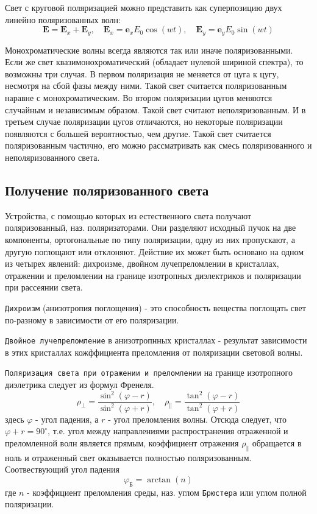 \documentclass[a4paper,12pt]{article}
\begin{document}
Свет с круговой поляризацией можно представить как суперпозицию двух линейно поляризованных волн:
$$
\mathbf{E} = \mathbf{E}_x +\mathbf{E}_y, \quad \mathbf{E}_x = \mathbf{e}_xE_0\cos(wt), \quad \mathbf{E}_y = \mathbf{e}_yE_0\sin(wt)
$$

Монохроматические волны всегда являются так или иначе поляризованными. Если же свет квазимонохроматический (обладает нулевой шириной спектра), то возможны три случая. В первом поляризация не меняется от цуга к цугу, несмотря на сбой фазы между ними. Такой свет считается поляризованным наравне с монохроматическим. Во втором поляризации цугов меняются случайным и независимым образом. Такой свет считают неполяризованным. И в третьем случае поляризации цугов отличаются, но некоторые поляризации появляются с большей вероятностью, чем другие. Такой свет считается поляризованным частично, его можно рассматривать как смесь поляризованного и неполяризованного света.

\subsection{Получение поляризованного света}

Устройства, с помощью которых из естественного света получают поляризованный, наз. поляризаторами. Они разделяют исходный пучок на две компоненты, ортогональные по типу поляризации, одну из них пропускают, а другую поглощают или отклоняют. Действие их может быть основано на одном из четырех явлений: дихроизме, двойном лучепреломлении в кристаллах, отражении и преломлении на границе изотропных диэлектриков и поляризации при рассеянии света.

\texttt{Дихроизм} (анизотропия поглощения) - это способность вещества поглощать свет по-разному в зависимости от его поляризации. 

\texttt{Двойное лучепреломление} в анизотропнных кристаллах - результат зависимости в этих кристаллах кожффициента преломления от поляризации световой волны.

\texttt{Поляризация света при отражении и преломлении} на границе изотропного диэлетрика следует из формул Френеля.
$$
\rho_\perp=\frac{\sin^2{(\varphi-r)}}{\sin^2{(\varphi+r)}}, \quad \rho_\|=\frac{\tan^2{(\varphi-r)}}{\tan^2{(\varphi+r)}}
$$
здесь $\varphi$ - угол падения, а $r$ - угол преломления волны. Отсюда следует, что $\varphi+r=90^\circ$, т.е. угол между направлениями распространения отраженной и преломленной волн является прямым, коэффициент отражения $\rho_\|$ обращается в ноль и отраженный свет оказывается полностью поляризованным. Соотвествующий угол падения
$$
\varphi_\text{Б} =\arctan{(n)}
$$
где $n$ - коэффициент преломления среды, наз. углом \texttt{Брюстера} или углом полной поляризации. 
\end{document}
